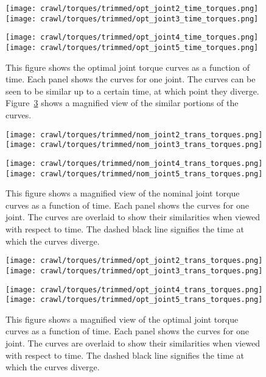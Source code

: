 \begin{figure}
  \centerline{
    \texttt{[image: crawl/torques/trimmed/opt\_joint2\_time\_torques.png]}
    \texttt{[image: crawl/torques/trimmed/opt\_joint3\_time\_torques.png]}
  }
  \centerline{
    \texttt{[image: crawl/torques/trimmed/opt\_joint4\_time\_torques.png]}
    \texttt{[image: crawl/torques/trimmed/opt\_joint5\_time\_torques.png]}
  }
  \caption{This figure shows the optimal joint torque curves as a function of time.
           Each panel shows the curves for one joint. The curves can be seen to be similar
           up to a certain time, at which point they diverge.
           Figure~\ref{fig:vrep_opt_joint_transient_torques_by_joint1} shows a magnified
           view of the similar portions of the curves.}
  \label{fig:vrep_opt_joint_torques_by_joint_over_time1}
\end{figure}

\begin{figure}
  \centerline{
    \texttt{[image: crawl/torques/trimmed/nom\_joint2\_trans\_torques.png]}
    \texttt{[image: crawl/torques/trimmed/nom\_joint3\_trans\_torques.png]}
  }
  \centerline{
    \texttt{[image: crawl/torques/trimmed/nom\_joint4\_trans\_torques.png]}
    \texttt{[image: crawl/torques/trimmed/nom\_joint5\_trans\_torques.png]}
  }
  \caption{This figure shows a magnified view of the nominal joint torque curves as a function of time.
           Each panel shows the curves for one joint. The curves are overlaid to show their
           similarities when viewed with respect to time. The dashed black line signifies
           the time at which the curves diverge.}
  \label{fig:vrep_nom_joint_transient_torques_by_joint1}
\end{figure}

\begin{figure}
  \centerline{
    \texttt{[image: crawl/torques/trimmed/opt\_joint2\_trans\_torques.png]}
    \texttt{[image: crawl/torques/trimmed/opt\_joint3\_trans\_torques.png]}
  }
  \centerline{
    \texttt{[image: crawl/torques/trimmed/opt\_joint4\_trans\_torques.png]}
    \texttt{[image: crawl/torques/trimmed/opt\_joint5\_trans\_torques.png]}
  }
  \caption{This figure shows a magnified view of the optimal joint torque curves as a function of time.
           Each panel shows the curves for one joint. The curves are overlaid to show their
           similarities when viewed with respect to time. The dashed black line signifies
           the time at which the curves diverge.}
  \label{fig:vrep_opt_joint_transient_torques_by_joint1}
\end{figure}

